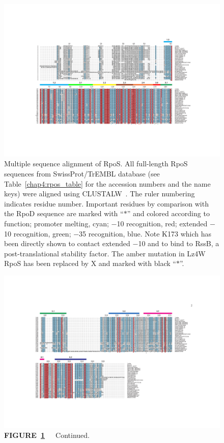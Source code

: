 \begin{figure}
\centering
\includegraphics{figures/chap4_rpos_align_1}
\caption[Multiple sequence alignment of RpoS sequences]{Multiple
sequence alignment of RpoS. All full-length RpoS sequences from
SwissProt/TrEMBL database (see Table~\ref{chap4:rpos_table} for
the accession numbers and the name keys) were aligned using
CLUSTALW~\citep{Higgins1996}. The ruler numbering indicates
 residue number. Important residues by comparison with
the RpoD sequence are marked with ``$\ast$'' and colored according
to function; promoter melting, cyan; $-$10 recognition, red;
extended $-$10 recognition, green; $-$35 recognition, blue. Note
K173 which has been directly shown to contact extended $-$10 and
to bind to RssB, a post-translational stability factor. The amber
mutation in Lz4W RpoS has been replaced by X and marked with black
``$\ast$''.} \label{rpos_align}
\end{figure}
\begin{figure}
\centering
\includegraphics{figures/chap4_rpos_align_2}
{\footnotesize\bfseries\sffamily
FIGURE~\ref{rpos_align}}~{\footnotesize\sffamily\ \ Continued.}
\end{figure}


